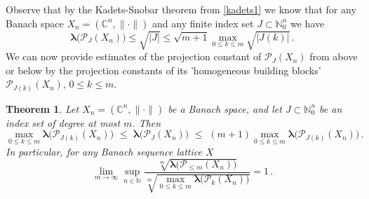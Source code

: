 \documentclass[12pt]{amsart}
\numberwithin{subsection}{section}
\newtheorem{theorem}{Theorem}[section]
\theoremstyle{definition}
\theoremstyle{remark}
\begin{document}
Observe that by the Kadets-Snobar theorem from \eqref{kadets1} we know that for any Banach space $X_n = (\mathbb{C}^n, \|\cdot\|) $
and any finite index set $J \subset \mathbb{N}_0^n $ we have
\begin{equation*}\label{tincho}
\boldsymbol{\lambda}\big(\mathcal{P}_{J}(X_n)\big) \leq \sqrt{|J|} \leq \sqrt{ m+1} \max_{0 \leq k \leq m} \sqrt{|J(k)|}\,.
\end{equation*}
We can now provide estimates of the projection constant of $\mathcal{P}_{J}(X_n)$ from above or below by the projection constants
of its 'homogeneous building blocks' $\mathcal{P}_{J(k)}(X_n), \, 0 \leq k \leq m$.

\begin{theorem} \label{degree-homo}
Let $X_n = (\mathbb{C}^n, \|\cdot\|) $ be a Banach space, and let $J \subset \mathbb{N}_0^n$ be an index set of degree at most $m$. Then
\[
\max_{0 \leq k \leq m} \boldsymbol{\lambda}\big(\mathcal{P}_{J(k)}(X_n)\big) \,\,\leq \,\,
\boldsymbol{\lambda}\big(\mathcal{P}_{J}(X_n)\big)
\,\,\leq \,\,(m+1) \max_{0 \leq k \leq m} \boldsymbol{\lambda}\big(\mathcal{P}_{J(k)}(X_n)\big)\,.
\]
In particular, for any  Banach sequence lattice $X$
\[
\lim_{m \to \infty}  \sup_{n\in \mathbb{\mathbb{N}}}
\frac{\sqrt[m]{\boldsymbol{\lambda}\big(\mathcal{P}_{\leq m}(X_n)\big)}}{\sqrt[m]{\max_{0 \leq k \leq m} \boldsymbol{\lambda}\big(\mathcal{P}_{k}(X_n)\big)}} = 1\,.
\]
\end{theorem}
\end{document}
